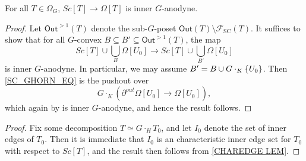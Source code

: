 \documentclass[a4paper,10pt,draft]{article}%
\begin{document}
\begin{proposition}
      \label{SC_IN_GHORN_THM}
      For all $T \in \Omega_G$, $Sc[T] \to \Omega[T]$ is inner $G$-anodyne.
\end{proposition}
{\color{blue} %
\begin{proof}
      Let $\mathsf{Out}^{>1}(T)$ denote the sub-$G$-poset $\mathsf{Out}(T) \setminus \mathscr{F}_{\mathrm{SC}}(T)$.
      It suffices to show that for all $G$-convex $B \subseteq B' \subseteq \mathsf{Out}^{>1}(T)$, the map
      \begin{equation}
            \label{SC_GHORN_EQ}
            Sc[T] \cup \mathop{\bigcup}\limits_{B}\Omega[U_0]
            \to
            Sc[T] \cup \mathop{\bigcup}\limits_{B'}\Omega[U_0]
      \end{equation}
      is inner $G$-anodyne. In particular, we may assume $B' = B \cup G \cdot_K \left\{U_0\right\}$.
      Then \eqref{SC_GHORN_EQ} is the pushout over
      \begin{equation}
                  G\cdot_K \left(\partial^{out}\Omega[U_0] \to \Omega[U_0] \right),
      \end{equation}
      which again by \cite[Proposition 6.17]{Per17} is inner $G$-anodyne, and hence the result follows.
\end{proof}
} %
\begin{proof}
      Fix some decomposition $T \simeq G \cdot_H T_0$, and let $I_0$ denote the set of inner edges of $T_0$.
      Then it is immediate that $I_0$ is an characteristic inner edge set for $T_0$ with respect to $Sc[T]$,
      and the result then follows from \cref{CHAREDGE LEM}.
\end{proof}
\end{document}
